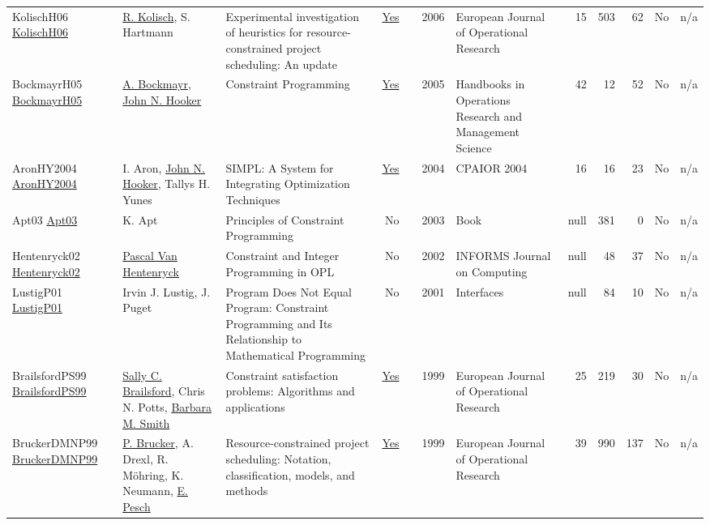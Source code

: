 {\begin{longtable}{>{\raggedright\arraybackslash}p{3cm}>{\raggedright\arraybackslash}p{6cm}>{\raggedright\arraybackslash}p{6.5cm}rrrp{2.5cm}rrrrr}
KolischH06 \href{http://dx.doi.org/10.1016/j.ejor.2005.01.065}{KolischH06} & \hyperref[auth:a443]{R. Kolisch}, S. Hartmann & Experimental investigation of heuristics for resource-constrained project scheduling: An update & \href{../works/KolischH06.pdf}{Yes} & \cite{KolischH06} & 2006 & European Journal of Operational Research & 15 & 503 & 62 & No & n/a\\
BockmayrH05 \href{http://dx.doi.org/10.1016/s0927-0507(05)12010-6}{BockmayrH05} & \hyperref[auth:a916]{A. Bockmayr}, \hyperref[auth:a161]{John N. Hooker} & Constraint Programming & \href{../works/BockmayrH05.pdf}{Yes} & \cite{BockmayrH05} & 2005 & Handbooks in Operations Research and Management Science & 42 & 12 & 52 & No & n/a\\
AronHY2004 \href{http://dx.doi.org/10.1007/978-3-540-24664-0_2}{AronHY2004} & I. Aron, \hyperref[auth:a161]{John N. Hooker}, Tallys H. Yunes & SIMPL: A System for Integrating Optimization Techniques & \href{../works/AronHY2004.pdf}{Yes} & \cite{AronHY2004} & 2004 & CPAIOR 2004 & 16 & 16 & 23 & No & n/a\\
Apt03 \href{http://dx.doi.org/10.1017/cbo9780511615320}{Apt03} & K. Apt & Principles of Constraint Programming & No & \cite{Apt03} & 2003 & Book & null & 381 & 0 & No & n/a\\
Hentenryck02 \href{http://dx.doi.org/10.1287/ijoc.14.4.345.2826}{Hentenryck02} & \hyperref[auth:a149]{Pascal Van Hentenryck} & Constraint and Integer Programming in OPL & No & \cite{Hentenryck02} & 2002 & INFORMS Journal on Computing & null & 48 & 37 & No & n/a\\
LustigP01 \href{http://dx.doi.org/10.1287/inte.31.6.29.9647}{LustigP01} & Irvin J. Lustig, J. Puget & Program Does Not Equal Program: Constraint Programming and Its Relationship to Mathematical Programming & No & \cite{LustigP01} & 2001 & Interfaces & null & 84 & 10 & No & n/a\\
BrailsfordPS99 \href{http://dx.doi.org/10.1016/s0377-2217(98)00364-6}{BrailsfordPS99} & \hyperref[auth:a1066]{Sally C. Brailsford}, Chris N. Potts, \hyperref[auth:a1068]{Barbara M. Smith} & Constraint satisfaction problems: Algorithms and applications & \href{../works/BrailsfordPS99.pdf}{Yes} & \cite{BrailsfordPS99} & 1999 & European Journal of Operational Research & 25 & 219 & 30 & No & n/a\\
BruckerDMNP99 \href{http://dx.doi.org/10.1016/s0377-2217(98)00204-5}{BruckerDMNP99} & \hyperref[auth:a854]{P. Brucker}, A. Drexl, R. M\"{o}hring, K. Neumann, \hyperref[auth:a441]{E. Pesch} & Resource-constrained project scheduling: Notation, classification, models, and methods & \href{../works/BruckerDMNP99.pdf}{Yes} & \cite{BruckerDMNP99} & 1999 & European Journal of Operational Research & 39 & 990 & 137 & No & n/a\\

\end{longtable}}

